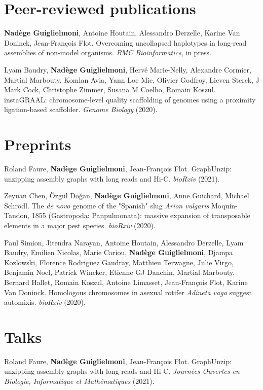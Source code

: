 \section*{Peer-reviewed publications}

\textbf{Nadège Guiglielmoni}, Antoine Houtain, Alessandro Derzelle, Karine Van Doninck, Jean-François Flot. Overcoming uncollapsed haplotypes in long-read assemblies of non-model organisms. \textit{BMC Bioinformatics}, in press.

Lyam Baudry, \textbf{Nadège Guiglielmoni}, Hervé Marie-Nelly, Alexandre Cormier, Martial Marbouty, Komlan Avia, Yann Loe Mie, Olivier Godfroy, Lieven Sterck, J Mark Cock, Christophe Zimmer, Susana M Coelho, Romain Koszul. instaGRAAL: chromosome-level quality scaffolding of genomes using a proximity ligation-based scaffolder. \textit{Genome Biology} (2020).

\section*{Preprints}

Roland Faure, \textbf{Nadège Guiglielmoni}, Jean-François Flot. GraphUnzip: unzipping assembly graphs with long reads and Hi-C. \textit{bioRxiv} (2021). 

Zeyuan Chen, Özgül Doğan, \textbf{Nadège Guiglielmoni}, Anne Guichard, Michael Schrödl. The \textit{de novo} genome of the "Spanish" slug \textit{Arion vulgaris} Moquin-Tandon, 1855 (Gastropoda: Panpulmonata): massive expansion of transposable elements in a major pest species. \textit{bioRxiv} (2020). 

Paul Simion, Jitendra Narayan, Antoine Houtain, Alessandro Derzelle, Lyam Baudry, Emilien Nicolas, Marie Cariou, \textbf{Nadège Guiglielmoni}, Djampa Kozlowski, Florence Rodriguez Gaudray, Matthieu Terwagne, Julie Virgo, Benjamin Noel, Patrick Wincker, Etienne GJ Danchin, Martial Marbouty, Bernard Hallet, Romain Koszul, Antoine Limasset, Jean-François Flot, Karine Van Doninck. Homologous chromosomes in asexual rotifer \textit{Adineta vaga} suggest automixis. \textit{bioRxiv} (2020).

\section*{Talks}

Roland Faure, \textbf{Nadège Guiglielmoni}, Jean-François Flot. GraphUnzip: unzipping assembly graphs with long reads and Hi-C. \textit{Journées Ouvertes en Biologie, Informatique et Mathématiques} (2021).

